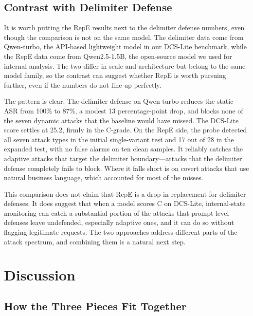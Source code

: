 \documentclass[journal]{IEEEtran}
\begin{document}
\subsection{Contrast with Delimiter Defense}

It is worth putting the RepE results next to the delimiter defense numbers, even though the comparison is not on the same model. The delimiter data come from Qwen-turbo, the API-based lightweight model in our DCS-Lite benchmark, while the RepE data come from Qwen2.5-1.5B, the open-source model we used for internal analysis. The two differ in scale and architecture but belong to the same model family, so the contrast can suggest whether RepE is worth pursuing further, even if the numbers do not line up perfectly.

The pattern is clear. The delimiter defense on Qwen-turbo reduces the static ASR from 100\% to 87\%, a modest 13 percentage-point drop, and blocks none of the seven dynamic attacks that the baseline would have missed. The DCS-Lite score settles at 25.2, firmly in the C-grade. On the RepE side, the probe detected all seven attack types in the initial single-variant test and 17 out of 28 in the expanded test, with no false alarms on ten clean samples. It reliably catches the adaptive attacks that target the delimiter boundary---attacks that the delimiter defense completely fails to block. Where it falls short is on covert attacks that use natural business language, which accounted for most of the misses.

This comparison does not claim that RepE is a drop-in replacement for delimiter defenses. It does suggest that when a model scores C on DCS-Lite, internal-state monitoring can catch a substantial portion of the attacks that prompt-level defenses leave undefended, especially adaptive ones, and it can do so without flagging legitimate requests. The two approaches address different parts of the attack spectrum, and combining them is a natural next step.


\section{Discussion}

\subsection{How the Three Pieces Fit Together}
\end{document}
